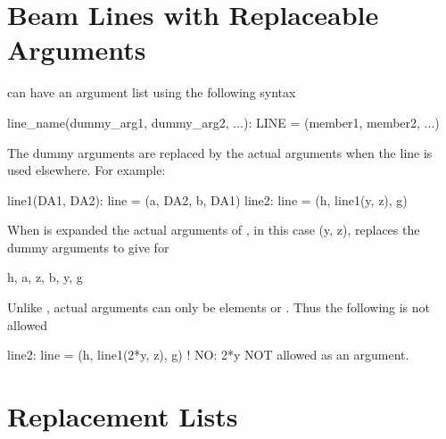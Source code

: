 \section{Beam Lines with Replaceable Arguments}
\label{s:lines.with.arg}

 can have an argument list using the following syntax
\begin{example}
  line_name(dummy_arg1, dummy_arg2, ...): LINE = (member1, member2, ...)
\end{example}
The dummy arguments are replaced by the actual arguments when the line is used
elsewhere. For example:
\begin{example}
  line1(DA1, DA2): line = (a, DA2, b, DA1)
  line2: line = (h, line1(y, z), g)
\end{example}
When  is expanded the actual arguments of , in this
case \vn(y, z), replaces the dummy arguments  to give for
\begin{example}
  h, a, z, b, y, g
\end{example} 
Unlike \mad,  actual arguments can only be elements or . 
Thus the following is not allowed
\begin{example}
  line2: line = (h, line1(2*y, z), g)   ! NO: 2*y NOT allowed as an argument.
\end{example}

\section{Replacement Lists}
\label{s:replace.list}

